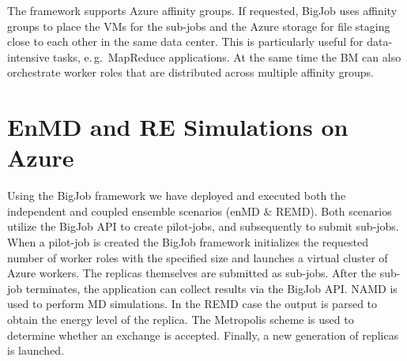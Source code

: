 \documentclass[conference,final]{IEEEtran}
\newcommand{\up}{\vspace*{-1em}}
\newcommand{\alnote}[1]{ {\textcolor{blue} { ***AL: #1 }}}
\newcommand{\jhanote}[1]{ {\textcolor{red} { ***SJ: #1 }}}
\newcommand{\alnote}[1]{}
\newcommand{\jhanote}[1]{}
\begin{document}
The framework supports Azure affinity groups.  %
If requested, BigJob uses affinity groups to place the VMs for the
sub-jobs and the Azure storage for file staging close to each other in
the same data center.  This is particularly useful for data-intensive
tasks, e.\,g.\ MapReduce applications. At the same time the BM can
also orchestrate worker roles that are distributed across multiple
affinity groups.




\up
\section{EnMD and RE Simulations on Azure}
\label{sec:enMD-REMD}
\up Using the BigJob framework we have deployed and executed both the
independent and coupled ensemble scenarios (enMD \& REMD).  Both
scenarios utilize the BigJob API to create pilot-jobs, and
subsequently to submit sub-jobs. When a pilot-job is created the
BigJob framework initializes the requested number of worker roles with
the specified size and launches a virtual cluster of Azure
workers. The replicas themselves are submitted as sub-jobs.  After the
sub-job terminates, the application can
collect results via the BigJob API.  NAMD is used to perform MD
simulations.  In the REMD case the output is parsed to obtain the
energy level of the replica.  The Metropolis scheme is used to
determine whether an exchange is accepted. Finally, a new generation
of replicas is launched.


\end{document}
